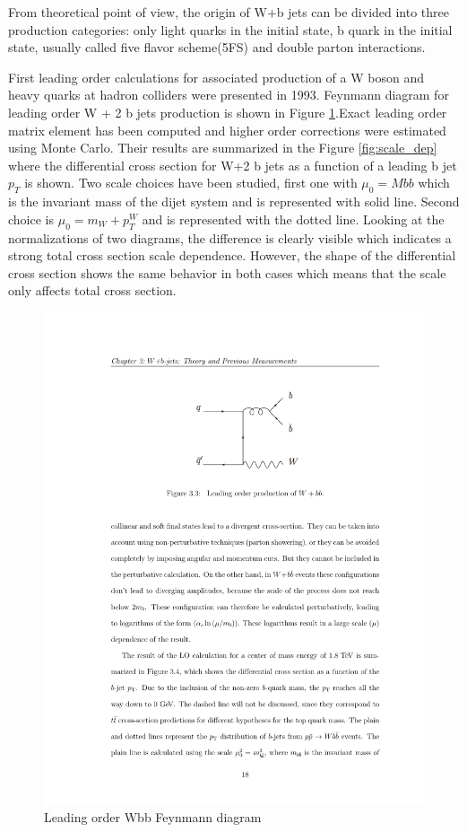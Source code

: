 From theoretical point of view, the origin of W+b jets can be divided into three production categories: only light quarks in the initial state, b quark in the initial state, usually called five flavor scheme(5FS) and double parton interactions.


First leading order calculations for associated production of a W boson and heavy quarks at hadron colliders were presented in 1993. Feynmann diagram for leading order W + 2 b jets production is shown in Figure \ref{fig:LO_diag}.Exact leading order matrix element has been computed and higher order corrections were estimated using Monte Carlo. Their results are summarized in the Figure \ref{fig:scale_dep} where the differential cross section for W+2 b jets as a function of a leading b jet $p_T$ is shown. Two scale choices have been studied, first one with $\mu_0=Mbb$ which is the invariant mass of the dijet system and is represented with solid line. Second choice is $\mu_0=m_W+p_T^W$ and is represented with the dotted line. Looking at the normalizations of two diagrams, the difference is clearly visible which indicates a strong total cross section scale dependence. However, the shape of the differential cross section shows the same behavior in both cases which means that the scale only affects total cross section.      
\begin{figure}[htbp]
	\centering
		\includegraphics{Figures/LO_diag.pdf}
	\caption[Leading order Wbb Feynmann diagram]{Leading order Wbb Feynmann diagram}
	\label{fig:LO_diag}
\end{figure}
